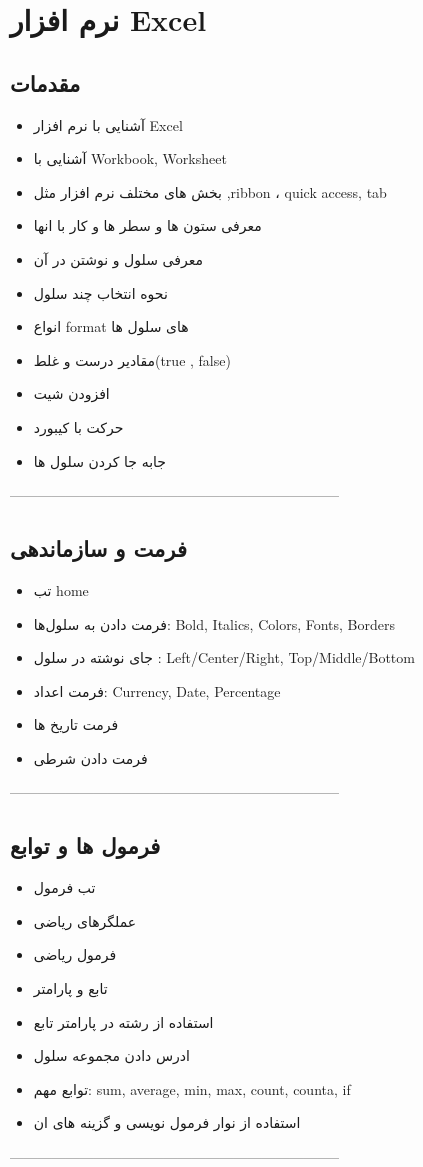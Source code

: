 \chapter{ نرم افزار Excel}
\section{مقدمات}
\begin{itemize}
\item
آشنایی با نرم افزار Excel
\item
آشنایی با Workbook, Worksheet
\item
بخش های مختلف نرم افزار مثل ,ribbon ، quick access, tab
\item
معرفی ستون ها و سطر ها و کار با انها
\item
معرفی سلول و نوشتن در آن
\item
نحوه انتخاب چند سلول
\item
انواع format های سلول ها
\item
مقادیر درست و غلط(true , false)
\item
افزودن شیت
\item
حرکت با کیبورد
\item
جابه جا کردن سلول ها
\end{itemize}
-----------------------------------------------------------------------
\section{فرمت و سازماندهی}
\begin{itemize}
\item
تب home
\item
فرمت دادن به سلول‌‌ها: Bold, Italics, Colors, Fonts, Borders
\item
جای نوشته در سلول : Left/Center/Right, Top/Middle/Bottom
\item
فرمت اعداد: Currency, Date, Percentage
\item
فرمت تاریخ ها
\item
فرمت دادن شرطی
\end{itemize}
-----------------------------------------------------------------------
\section{فرمول ها و توابع}
\begin{itemize}
\item
تب فرمول
\item
عملگرهای ریاضی
\item
فرمول ریاضی
\item
تابع و پارامتر
\item
استفاده از رشته در پارامتر تابع
\item
ادرس دادن مجموعه سلول
\item
توابع مهم: sum, average, min, max, count, counta, if
\item
استفاده از نوار فرمول نویسی و گزینه های ان

\end{itemize}
-----------------------------------------------------------------------

